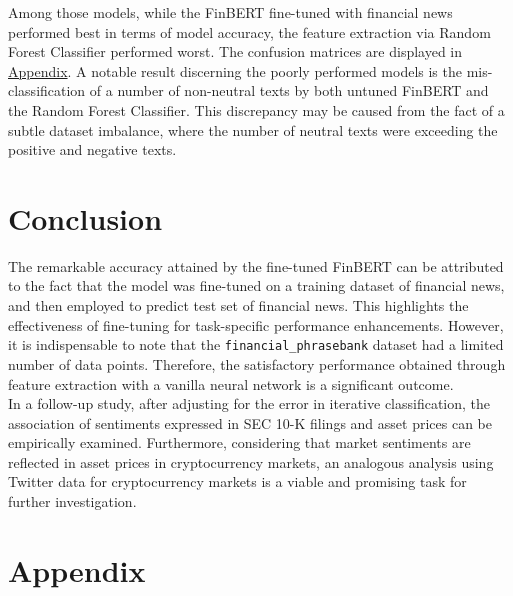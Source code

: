 \documentclass{article}
\begin{document}
\noindent Among those models, while the FinBERT fine-tuned with financial news performed best in terms of model accuracy, the feature extraction via Random Forest Classifier performed worst. The confusion matrices are displayed in \hyperref[sec:appendix]{Appendix}. A notable result discerning the poorly performed models is the mis-classification of a number of non-neutral texts by both untuned FinBERT and the Random Forest Classifier. This discrepancy may be caused from the fact of a subtle dataset imbalance, where the number of neutral texts were exceeding the positive and negative texts. 

\section{Conclusion}

The remarkable accuracy attained by the fine-tuned FinBERT can be attributed to the fact that the model was fine-tuned on a training dataset of financial news, and then employed to predict test set of financial news. This highlights the effectiveness of fine-tuning for task-specific performance enhancements. However, it is indispensable to note that the \texttt{financial\_phrasebank} dataset had a limited number of data points. Therefore, the satisfactory performance obtained through feature extraction with a vanilla neural network is a significant outcome. \\

\noindent In a follow-up study, after adjusting for the error in iterative classification, the association of sentiments expressed in SEC 10-K filings and asset prices can be empirically examined. Furthermore, considering that market sentiments are reflected in asset prices in cryptocurrency markets, an analogous analysis using Twitter data for cryptocurrency markets is a viable and promising task for further investigation.

\newpage




\newpage

\section*{Appendix}\label{sec:appendix}
\end{document}
